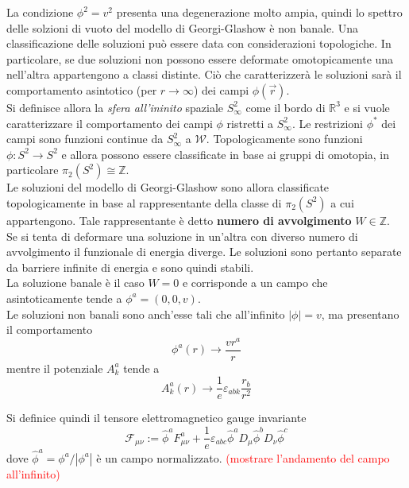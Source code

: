 La condizione $\phi^2 = v^2$ presenta una degenerazione molto ampia, quindi
lo spettro delle solzioni di vuoto del modello di Georgi-Glashow è non banale.
Una classificazione delle soluzioni può essere data con considerazioni topologiche.
In particolare, se due soluzioni non possono essere deformate omotopicamente una
nell'altra appartengono a classi distinte. Ciò che caratterizzerà le soluzioni
sarà il comportamento asintotico (per $r \to \infty$) dei campi $\phi(\vec r)$.\\

Si definisce allora la \emph{sfera all'ininito} spaziale $S^2_\infty$ come il bordo di
$\mathbb{R}^3$ e si vuole caratterizzare il comportamento dei campi $\phi$ ristretti a
$S^2_\infty$. Le restrizioni $\phi^*$ dei campi sono funzioni continue da $S^2_\infty$
a $\mathcal{W}$.
Topologicamente sono funzioni $\phi : S^2 \to S^2$ e allora possono essere
classificate in base ai gruppi di omotopia, in particolare $\pi_2(S^2) \cong \mathbb{Z}$.\\

Le soluzioni del modello di Georgi-Glashow sono allora classificate topologicamente
in base al rappresentante della classe di $\pi_2(S^2)$ a cui appartengono.
Tale rappresentante è detto \textbf{numero di avvolgimento} $W \in \mathbb{Z}$.\\

Se si tenta di deformare una soluzione in un'altra con diverso numero di avvolgimento
il funzionale di energia diverge. Le soluzioni sono pertanto separate da barriere
infinite di energia e sono quindi stabili.\\

La soluzione banale è il caso $W = 0$ e corrisponde a un campo che asintoticamente
tende a $\phi^a = (0,0,v)$.\\

Le soluzioni non banali sono anch'esse tali che all'infinito $|\phi| = v$, ma presentano
il comportamento
\begin{equation}\label{eq:nonabelianw1phi}
   \phi^a(r) \to \frac{vr^a}{r}
\end{equation}
mentre il potenziale $A_k^a$ tende a
\begin{equation}\label{eq:nonabelianw1A}
   A_k^a (r) \to \frac{1}{e} \varepsilon_{abk} \frac{r_b}{r^2}
\end{equation}

Si definice quindi il tensore elettromagnetico gauge invariante
\begin{equation}
   \mathcal{F}_{\mu\nu} := \hat{\phi}^a F^a_{\mu\nu}
          + \frac{1}{e} \varepsilon_{abc} \hat{\phi}^a D_\mu\hat{\phi}^b D_\nu \hat{\phi}^c
\end{equation}
dove $\hat{\phi}^a = \phi^a/|\phi^a|$ è un campo normalizzato.
\textcolor{red}{(mostrare l'andamento del campo all'infinito)}\\

